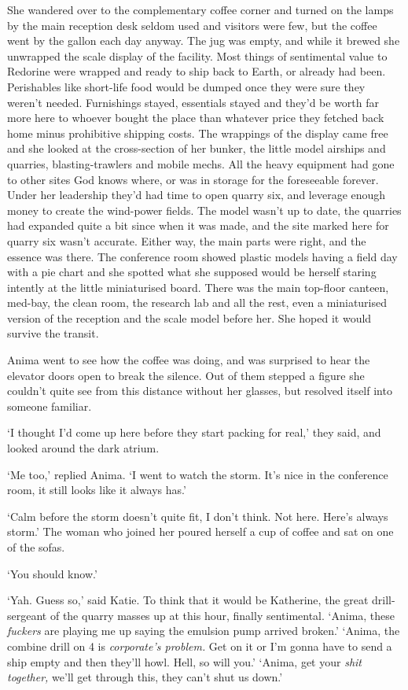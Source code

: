 She wandered over to the complementary coffee corner and turned on the
lamps by the main reception desk \textemdash{} seldom used and
visitors were few, but the coffee went by the gallon each day
anyway. The jug was empty, and while it brewed she unwrapped the scale
display of the facility. Most things of sentimental value to Redorine
were wrapped and ready to ship back to Earth, or already had
been. Perishables like short-life food would be dumped once they were
sure they weren't needed. Furnishings stayed, essentials stayed and
they'd be worth far more here to whoever bought the place than
whatever price they fetched back home minus prohibitive shipping
costs. The wrappings of the display came free and she looked at the
cross-section of her bunker, the little model airships and quarries,
blasting-trawlers and mobile mechs. All the heavy equipment had gone
to other sites God knows where, or was in storage for the foreseeable
forever. Under her leadership they'd had time to open quarry six, and
leverage enough money to create the wind-power fields. The model
wasn't up to date, the quarries had expanded quite a bit since when it
was made, and the site marked here for quarry six wasn't
accurate. Either way, the main parts were right, and the essence was
there. The conference room showed plastic models having a field day
with a pie chart and she spotted what she supposed would be herself
staring intently at the little miniaturised board. There was the main
top-floor canteen, med-bay, the clean room, the research lab and all
the rest, even a miniaturised version of the reception and the scale
model before her. She hoped it would survive the transit.

Anima went to see how the coffee was doing, and was surprised to hear
the elevator doors open to break the silence. Out of them stepped a
figure she couldn't quite see from this distance without her glasses,
but resolved itself into someone familiar.

`I thought I'd come up here before they start packing for real,' they
said, and looked around the dark atrium.

`Me too,' replied Anima. `I went to watch the storm. It's nice in the
conference room, it still looks like it always has.'

`Calm before the storm doesn't quite fit, I don't think. Not
here. Here's always storm.' The woman who joined her poured herself a
cup of coffee and sat on one of the sofas.

`You should know.'

`Yah. Guess so,' said Katie. To think that it would be Katherine, the
great drill-sergeant of the quarry masses up at this hour, finally
sentimental. ‘Anima, these \textit{fuckers} are playing me up saying
the emulsion pump arrived broken.' ‘Anima, the combine drill on 4 is
\textit{corporate's problem.} Get on it or I'm gonna have to send a
ship empty and then they'll howl. Hell, so will you.' ‘Anima, get your
\textit{shit together,} we'll get through this, they can't shut us
down.'


